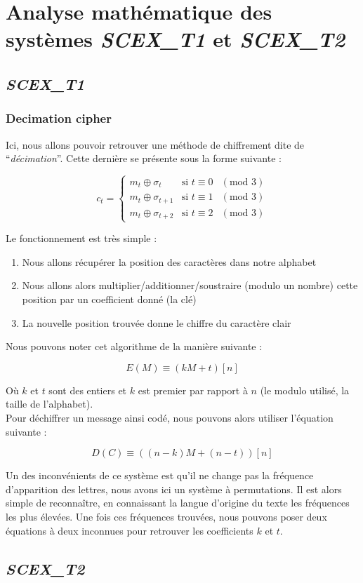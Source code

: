 \section{Analyse mathématique des systèmes \textit{SCEX\_T1} et \textit{SCEX\_T2}}
\subsection{\textit{SCEX\_T1}}
\subsubsection{Decimation cipher}
Ici, nous allons pouvoir retrouver une méthode de chiffrement dite de \enquote{\textit{décimation}}. Cette dernière se présente sous la forme suivante :
\begin{center}
    \begin{equation}
	c_t = \left\{
	    \begin{array}{lll}
		m_{t}\oplus\sigma_{t} & \mbox{si } t\equiv 0 & (\mbox{mod } 3) \\
		m_{t}\oplus\sigma_{t+1} & \mbox{si } t\equiv 1 & (\mbox{mod } 3) \\
		m_{t}\oplus\sigma_{t+2} & \mbox{si } t\equiv 2 & (\mbox{mod } 3)
	    \end{array}
	\right.
    \end{equation}
\end{center}

Le fonctionnement est très simple :

\begin{enumerate}
 \item Nous allons récupérer la position des caractères dans notre alphabet
 \item Nous allons alors multiplier/additionner/soustraire (modulo un nombre) cette position par un coefficient donné (la clé)
 \item La nouvelle position trouvée donne le chiffre du caractère clair
\end{enumerate}
Nous pouvons noter cet algorithme de la manière suivante :
\begin{center}
    \begin{equation}
	E(M)\equiv (kM+t)[n]
    \end{equation}
\end{center}
Où $k$ et $t$ sont des entiers et $k$ est premier par rapport à $n$ (le modulo utilisé, la taille de l'alphabet).\\
Pour déchiffrer un message ainsi codé, nous pouvons alors utiliser l'équation suivante :
\begin{center}
    \begin{equation}
	D(C)\equiv ((n-k)M+(n-t))[n]
    \end{equation}
\end{center}
Un des inconvénients de ce système est qu'il ne change pas la fréquence d'apparition des lettres, nous avons ici un système à permutations. Il est alors simple de reconnaître, en connaissant la langue d'origine du texte les fréquences les plus élevées. Une fois ces fréquences trouvées, nous pouvons poser deux équations à deux inconnues pour retrouver les coefficients $k$ et $t$.

\subsection{\textit{SCEX\_T2}}